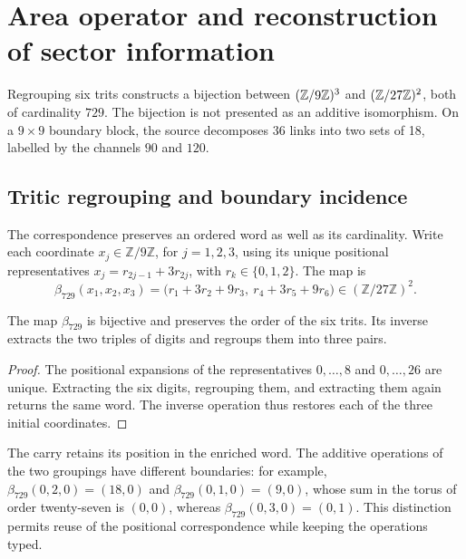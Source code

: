 \section{Area operator and reconstruction of sector information}
\label{v:ant:sec:area}
Regrouping six trits constructs a bijection between
$(\mathbb Z/9\mathbb Z)^3$ and $(\mathbb Z/27\mathbb Z)^2$, both of cardinality $729$.
The bijection is not presented as an additive isomorphism. On a
$9\times9$ boundary block, the source decomposes 36 links into two
sets of 18, labelled by the channels $90$ and $120$.

\subsection{Tritic regrouping and boundary incidence}
\label{v:ant:sec:ii-area-incidencia-explicita}

The correspondence preserves an ordered word as well as its cardinality.
Write each coordinate \(x_j\in\mathbb Z/9\mathbb Z\), for
\(j=1,2,3\), using its unique positional representatives
\(x_j=r_{2j-1}+3r_{2j}\), with \(r_k\in\{0,1,2\}\). The map is
\begin{equation}
 \beta_{729}(x_1,x_2,x_3)
 =\bigl(r_1+3r_2+9r_3,\ r_4+3r_5+9r_6\bigr)
 \in(\mathbb Z/27\mathbb Z)^2.
 \label{v:ant:eq:ii-area-beta729}
\end{equation}

\begin{proposition}
\label{v:ant:prop:ii-area-beta729}
The map \(\beta_{729}\) is bijective and preserves the order of the
six trits. Its inverse extracts the two triples of digits and regroups them
into three pairs.
\end{proposition}
\begin{proof}
The positional expansions of the representatives \(0,\ldots,8\) and
\(0,\ldots,26\) are unique. Extracting the six digits, regrouping them,
and extracting them again returns the same word. The inverse operation
thus restores each of the three initial coordinates.
\end{proof}

The carry retains its position in the enriched word. The additive operations
of the two groupings have different boundaries: for example,
\(\beta_{729}(0,2,0)=(18,0)\) and
\(\beta_{729}(0,1,0)=(9,0)\), whose sum in the torus of order
twenty-seven is \((0,0)\), whereas
\(\beta_{729}(0,3,0)=(0,1)\). This distinction permits reuse of
the positional correspondence while keeping the operations typed.

